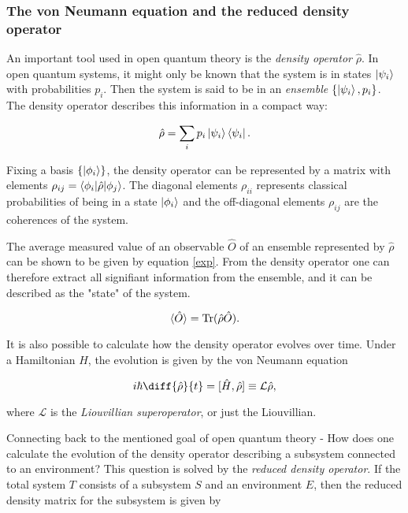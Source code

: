 \documentclass[../main.tex]{subfiles}
\begin{document}
\subsubsection{The von Neumann equation and the reduced density operator}

An important tool used in open quantum theory is the \textit{density operator} $\hat{\rho}$. In open quantum systems, it might only be known that the system is in states $\ket{\psi_i}$ with probabilities $p_i$. Then the system is said to be in an \textit{ensemble} $\{\ket{\psi_i}, p_i\}$. The density operator describes this information in a compact way:

\begin{equation}
    \hat{\rho} = \sum_i p_i \ket{\psi_i}\bra{\psi_i}.
\end{equation}

Fixing a basis $\{\ket{\phi_i}\}$, the density operator can be represented by a matrix with elements $\rho_{ij} = \braket{\phi_i|\hat\rho|\phi_j}$. The diagonal elements $\rho_{ii}$ represents classical probabilities of being in a state $\ket{\phi_i}$ and the off-diagonal elements $\rho_{ij}$ are the coherences of the system.

The average measured value of an observable $\hat O$ of an ensemble represented by $\hat\rho$ can be shown to be given by equation \ref{exp}. From the density operator one can therefore extract all signifiant information from the ensemble, and it can be described as the "state" of the system.

\begin{equation}\label{exp}
    \braket{\hat O} = \operatorname{Tr}({\hat\rho \hat O}).
\end{equation}

It is also possible to calculate how the density operator evolves over time. Under a Hamiltonian $\hat H$, the evolution is given by the von Neumann equation

\begin{equation}\label{vonneumann}
    i\hbar\diff{\hat\rho}{t} = [\hat H, \hat\rho] \equiv \mathcal{L}\hat\rho,
\end{equation}

where $\mathcal{L}$ is the \textit{Liouvillian superoperator}, or just the Liouvillian. 

Connecting back to the mentioned goal of open quantum theory - How does one calculate the evolution of the density operator describing a subsystem connected to an environment? This question is solved by the \textit{reduced density operator}. If the total system $T$ consists of a subsystem $S$ and an environment $E$, then the reduced density matrix for the subsystem is given by
\end{document}
